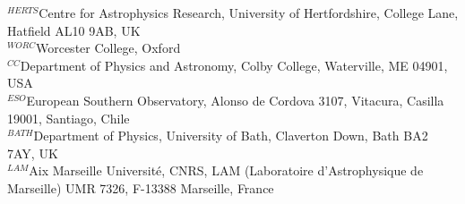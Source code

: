 \documentclass[useAMS,usenatbib]{mn2e}
\begin{document}
{$^{HERTS}$Centre for Astrophysics Research, University of Hertfordshire, College Lane, Hatfield AL10 9AB, UK\\
$^{WORC}$Worcester College, Oxford\\
$^{CC}$Department of Physics and Astronomy, Colby College, Waterville, ME 04901, USA\\
$^{ESO}$European Southern Observatory, Alonso de Cordova 3107, Vitacura, Casilla 19001, Santiago, Chile\\
$^{BATH}$Department of Physics, University of Bath, Claverton Down, Bath BA2 7AY, UK \\
$^{LAM}$Aix Marseille Universit\'e, CNRS, LAM (Laboratoire d'Astrophysique de Marseille) UMR 7326, F-13388 Marseille, France
   }

\maketitle
  
\label{firstpage}
  
\clearpage
\end{document}
